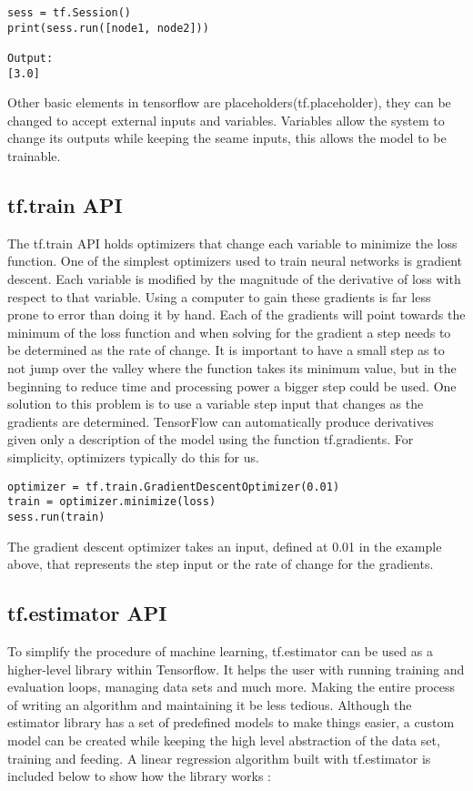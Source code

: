 \begin{lstlisting}
sess = tf.Session()
print(sess.run([node1, node2]))

Output:
[3.0]
\end{lstlisting}

Other basic elements in tensorflow are placeholders(tf.placeholder), 
they can be changed to accept external inputs and variables.
Variables allow the system to change its outputs while keeping the seame inputs, this allows the model to be trainable. 

\subsection{tf.train API}
The tf.train API holds optimizers that change each variable to minimize the loss function.
One of the simplest optimizers used to train neural networks is gradient descent.
Each variable is modified by the magnitude of the derivative of loss with respect to that variable.
Using a computer to gain these gradients is far less prone to error than doing it by hand.
Each of the gradients will point towards the minimum of the loss function and when solving for the gradient a step needs to be determined as the rate of change.
It is important to  have a small step as to not jump over the valley where the function takes its minimum value,
but in the beginning to reduce time and processing power a bigger step could be used.
One solution to this problem is to use a variable step input that changes as the gradients are determined.
TensorFlow can automatically produce derivatives given only a description of the model using the function tf.gradients.
For simplicity, optimizers typically do this for us.
\begin{lstlisting}
optimizer = tf.train.GradientDescentOptimizer(0.01)
train = optimizer.minimize(loss)
sess.run(train)
\end{lstlisting}
The gradient descent optimizer takes an input, defined at 0.01 in the example above,
that represents the step input or the rate of change for the gradients.

\subsection{tf.estimator API}
To simplify the procedure of machine learning,
tf.estimator can be used as a higher-level library within Tensorflow.
It helps the user with running training and evaluation loops, managing data sets and much more. 
Making the entire process of writing an algorithm and maintaining it be less tedious.
Although the estimator library has a set of predefined models to make things easier, a custom model can be created while keeping the high
level abstraction of the data set, training and feeding.
A linear regression algorithm built with tf.estimator is included below
to show how the library works \cite{Estimator}:

